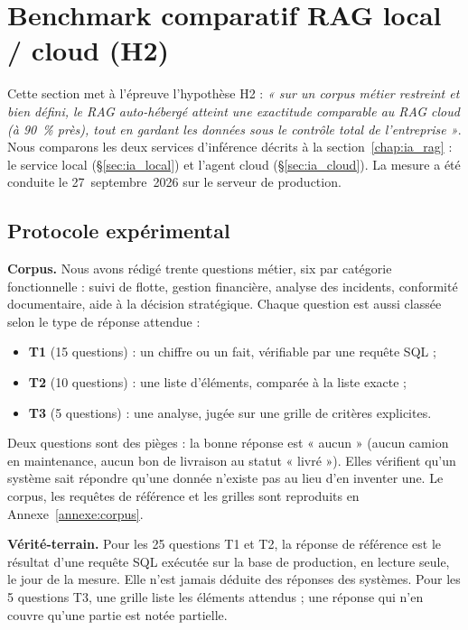 \section{Benchmark comparatif RAG local / cloud (H2)}
\label{chap:benchmark_rag}

Cette section met à l'épreuve l'hypothèse H2 : \emph{« sur un corpus métier restreint et bien défini, le RAG auto-hébergé atteint une exactitude comparable au RAG cloud (à 90~\% près), tout en gardant les données sous le contrôle total de l'entreprise »}. Nous comparons les deux services d'inférence décrits à la section~\ref{chap:ia_rag} : le service local (\S\ref{sec:ia_local}) et l'agent cloud (\S\ref{sec:ia_cloud}). La mesure a été conduite le 27~septembre~2026 sur le serveur de production.

\subsection{Protocole expérimental}
\label{sec:bench_protocole}

\textbf{Corpus.} Nous avons rédigé trente questions métier, six par catégorie fonctionnelle : suivi de flotte, gestion financière, analyse des incidents, conformité documentaire, aide à la décision stratégique. Chaque question est aussi classée selon le type de réponse attendue :
\begin{itemize}
    \item \textbf{T1} (15 questions) : un chiffre ou un fait, vérifiable par une requête SQL ;
    \item \textbf{T2} (10 questions) : une liste d'éléments, comparée à la liste exacte ;
    \item \textbf{T3} (5 questions) : une analyse, jugée sur une grille de critères explicites.
\end{itemize}
Deux questions sont des pièges : la bonne réponse est « aucun » (aucun camion en maintenance, aucun bon de livraison au statut « livré »). Elles vérifient qu'un système sait répondre qu'une donnée n'existe pas au lieu d'en inventer une. Le corpus, les requêtes de référence et les grilles sont reproduits en Annexe~\ref{annexe:corpus}.

\textbf{Vérité-terrain.} Pour les 25 questions T1 et T2, la réponse de référence est le résultat d'une requête SQL exécutée sur la base de production, en lecture seule, le jour de la mesure. Elle n'est jamais déduite des réponses des systèmes. Pour les 5 questions T3, une grille liste les éléments attendus ; une réponse qui n'en couvre qu'une partie est notée partielle.

